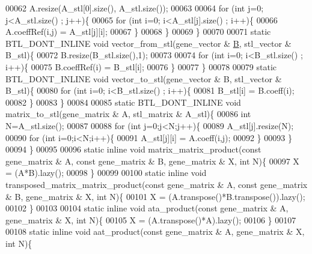 \begin{DoxyCode}
00062     A.resize(A\_stl[0].size(), A\_stl.size());
00063 
00064     \textcolor{keywordflow}{for} (\textcolor{keywordtype}{int} j=0; j<A\_stl.size() ; j++)\{
00065       \textcolor{keywordflow}{for} (\textcolor{keywordtype}{int} i=0; i<A\_stl[j].size() ; i++)\{
00066         A.coeffRef(i,j) = A\_stl[j][i];
00067       \}
00068     \}
00069   \}
00070 
00071   \textcolor{keyword}{static} BTL\_DONT\_INLINE  \textcolor{keywordtype}{void} vector\_from\_stl(gene\_vector & \hyperlink{group___core___module_class_eigen_1_1_matrix}{B}, stl\_vector & B\_stl)\{
00072     B.resize(B\_stl.size(),1);
00073 
00074     \textcolor{keywordflow}{for} (\textcolor{keywordtype}{int} i=0; i<B\_stl.size() ; i++)\{
00075       B.coeffRef(i) = B\_stl[i];
00076     \}
00077   \}
00078 
00079   \textcolor{keyword}{static} BTL\_DONT\_INLINE  \textcolor{keywordtype}{void} vector\_to\_stl(gene\_vector & B, stl\_vector & B\_stl)\{
00080     \textcolor{keywordflow}{for} (\textcolor{keywordtype}{int} i=0; i<B\_stl.size() ; i++)\{
00081       B\_stl[i] = B.coeff(i);
00082     \}
00083   \}
00084 
00085   \textcolor{keyword}{static} BTL\_DONT\_INLINE  \textcolor{keywordtype}{void} matrix\_to\_stl(gene\_matrix & A, stl\_matrix & A\_stl)\{
00086     \textcolor{keywordtype}{int} N=A\_stl.size();
00087 
00088     \textcolor{keywordflow}{for} (\textcolor{keywordtype}{int} j=0;j<N;j++)\{
00089       A\_stl[j].resize(N);
00090       \textcolor{keywordflow}{for} (\textcolor{keywordtype}{int} i=0;i<N;i++)\{
00091         A\_stl[j][i] = A.coeff(i,j);
00092       \}
00093     \}
00094   \}
00095 
00096   \textcolor{keyword}{static} \textcolor{keyword}{inline} \textcolor{keywordtype}{void} matrix\_matrix\_product(\textcolor{keyword}{const} gene\_matrix & A, \textcolor{keyword}{const} gene\_matrix & B, gene\_matrix & X, \textcolor{keywordtype}{
      int} N)\{
00097     X = (A*B).lazy();
00098   \}
00099 
00100   \textcolor{keyword}{static} \textcolor{keyword}{inline} \textcolor{keywordtype}{void} transposed\_matrix\_matrix\_product(\textcolor{keyword}{const} gene\_matrix & A, \textcolor{keyword}{const} gene\_matrix & B, 
      gene\_matrix & X, \textcolor{keywordtype}{int} N)\{
00101     X = (A.transpose()*B.transpose()).lazy();
00102   \}
00103 
00104   \textcolor{keyword}{static} \textcolor{keyword}{inline} \textcolor{keywordtype}{void} ata\_product(\textcolor{keyword}{const} gene\_matrix & A, gene\_matrix & X, \textcolor{keywordtype}{int} N)\{
00105     X = (A.transpose()*A).lazy();
00106   \}
00107 
00108   \textcolor{keyword}{static} \textcolor{keyword}{inline} \textcolor{keywordtype}{void} aat\_product(\textcolor{keyword}{const} gene\_matrix & A, gene\_matrix & X, \textcolor{keywordtype}{int} N)\{

\end{DoxyCode}
